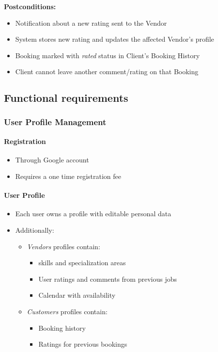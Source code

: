 \documentclass[11pt,a4paper]{article}
\begin{document}
\noindent \textbf{Postconditions:}
\begin{itemize}
  \item Notification about a new rating sent to the Vendor
  \item System stores new rating and updates the affected Vendor's profile
  \item Booking marked with \textit{rated} status in Client's Booking History
  \item Client cannot leave another comment/rating on that Booking
\end{itemize}

\subsection{Functional requirements}

\subsubsection{User Profile Management}

\paragraph{Registration}

\begin{itemize}
  \item Through Google account
  \item Requires a one time registration fee
\end{itemize}

\paragraph{User Profile}
\begin{itemize}
  \item Each user owns a profile with editable personal data
  \item Additionally:
    \begin{itemize}
      \item \textit{Vendors} profiles contain:
        \begin{itemize}
          \item skills and specialization areas
          \item User ratings and comments from previous jobs
          \item Calendar with availability
        \end{itemize}
      \item \textit{Customers} profiles contain:
        \begin{itemize}
          \item Booking history
          \item Ratings for previous bookings
        \end{itemize}
    \end{itemize}
\end{itemize}
\end{document}
